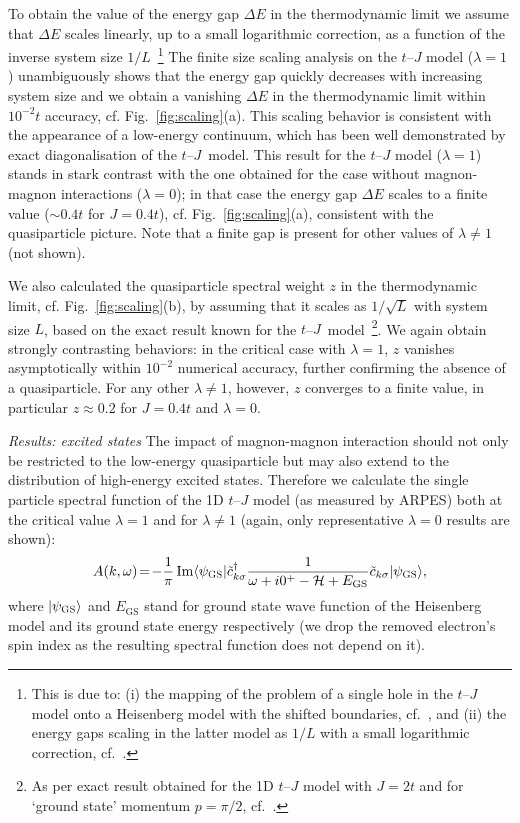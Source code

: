 \documentclass[%
 reprint,
 amsmath,amssymb,
 aps,
prl,
]{revtex4-1}
\newcommand{\bra}[1]{\langle#1\rvert}
\newcommand{\ket}[1]{\lvert#1\rangle}
\begin{document}
To obtain the value of the energy gap $\Delta E$ in the thermodynamic limit we assume that $\Delta E$ scales linearly, up to a small logarithmic correction, as a function of the inverse system size $1/L$~\footnote{This is due to: (i) the mapping of the problem of a single hole in the $t$--$J$ model onto a Heisenberg model with the shifted boundaries, cf.~\cite{Sorella1998}, and (ii) the energy gaps scaling in the latter model as $1/L$
with a small logarithmic correction, cf.~\cite{Haas1998}.} The finite size scaling analysis on the $t$--$J$ model ($\lambda=1$) unambiguously shows that the energy gap quickly decreases with increasing system size and we obtain 
a vanishing $\Delta E$ in the thermodynamic limit within $10^{-2}t$ accuracy,
cf. Fig.~\ref{fig:scaling}(a).
This scaling behavior is consistent with the appearance of a low-energy continuum, which has been well demonstrated by exact diagonalisation of the $t$--$J$~model.
This result for the $t$--$J$ model ($\lambda =1$) stands in stark contrast with the one obtained for the case without magnon-magnon interactions ($\lambda=0$); in that case the energy gap $\Delta E$ scales to a finite value ($\sim 0.4 t$ for $J=0.4t$), cf. Fig.~\ref{fig:scaling}(a),
consistent with the quasiparticle picture. Note that a finite gap is present for other values of $\lambda\ne1$ (not shown). 

We also calculated the quasiparticle spectral weight $z$ in the thermodynamic limit, cf. Fig.~\ref{fig:scaling}(b), by assuming that it scales as $1/\sqrt{L}$ with system size $L$, based on the exact result known for the $t$--$J$~model~\footnote{As per exact result obtained for the 1D $t$--$J$ model with $J=2t$ and for `ground state' momentum $p=\pi/2$, cf.~\cite{Sorella1996}.}. We again obtain strongly contrasting behaviors: in the critical case with $\lambda=1$,  $z$ vanishes  asymptotically  within $10^{-2}$ numerical accuracy, further confirming the absence of a quasiparticle. For any other $\lambda\ne 1$, however, $z$ converges to a finite value, in particular $z \approx 0.2$ for $J=0.4t$ and $\lambda=0$.

{\it Results: excited states} The impact of magnon-magnon interaction should not only be restricted to the low-energy quasiparticle but may also extend to the distribution of high-energy excited states. Therefore we calculate the single particle spectral function of the 1D $t$--$J$ model (as measured by ARPES) both at the critical value $\lambda=1$ and for $\lambda\ne 1$ (again, only representative $\lambda=0$ results are shown):
\begin{equation}\label{eq:spectral_function}
    A(k,\omega) \!=\! -\frac{1}{\pi}\operatorname{Im}\bra{\psi_\textsc{GS}} \tilde{c}^\dag_{k\sigma} \frac{1}{\omega + i0^+ - \mathcal{H} + E_{\text{GS}}} \tilde{c}_{k\sigma} \ket{\psi_\textsc{GS}},
\end{equation}
where $\ket{\psi_\textsc{GS}}$ and $E_{\text{GS}}$ stand for ground state wave function of the Heisenberg model and its ground state energy respectively (we drop the removed electron's spin index as the resulting spectral function does not depend on it).
\end{document}
